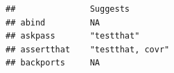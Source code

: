 \documentclass[]{article}
\begin{document}
\begin{verbatim}
##               Suggests                                                                                                                                                                                                                                                                                                                                                                                                                                                                                                                                                                                  
## abind         NA                                                                                                                                                                                                                                                                                                                                                                                                                                                                                                                                                                                        
## askpass       "testthat"                                                                                                                                                                                                                                                                                                                                                                                                                                                                                                                                                                                
## assertthat    "testthat, covr"                                                                                                                                                                                                                                                                                                                                                                                                                                                                                                                                                                          
## backports     NA                                                                                                                                                                                                                                                                                                                                                                                                                                                                                                                                                                                        

\end{verbatim}
\end{document}
